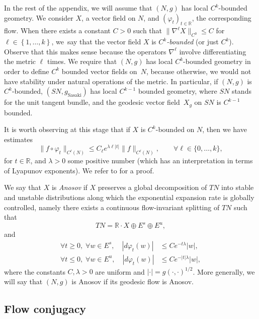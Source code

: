 \documentclass[10pt]{amsart}
\newcommand{\R}{\mathbb{R}}
\theoremstyle{plain}
\theoremstyle{definition}
\begin{document}
In the rest of the appendix, we will assume that $(N,g)$ has local $C^k$-bounded geometry. We consider $X$, a vector field on $N$, and $(\varphi_t)_{t \in \R}$, the corresponding flow. When there exists a constant $C > 0$ such that $\|\nabla^\ell X\|_{C^0} \leq C$ for $\ell \in \left\{1,\dots, k\right\}$, we~say that the vector field $X$ is \emph{$C^k$-bounded} (or just $C^k$). Observe that this makes sense because the operators $\nabla^\ell$ involve differentiating the metric $\ell$ times. We require that $(N,g)$ has local $C^k$-bounded geometry in order to define $C^k$ bounded vector fields on~$N$, because otherwise, we would not have stability under natural operations of the metric. In particular, if $(N,g)$ is $C^k$-bounded, $(SN, g_{\text{Sasaki}})$ has local $C^{k-1}$ bounded geometry, where $SN$ stands for the unit tangent bundle, and the geodesic vector field~$X_g$ on $SN$ is $C^{k-1}$ bounded.

It is worth observing at this stage that if $X$ is $C^k$-bounded on $N$, then we have estimates
\[
\| f\circ \varphi_t \|_{C^\ell(N)} \leq C_\ell e^{\lambda \ell |t|} \| f \|_{C^\ell(N)},\qquad \forall \ell \in\{0,\dots,k\},
\]
for $t\in \R$, and $\lambda > 0$ some positive number (which has an interpretation in terms of Lyapunov exponents). We refer to \cite[Prop.\,A.4.A]{Bonthonneau-15} for a proof.

We say that $X$ is \emph{Anosov} if $X$ preserves a global decomposition of $TN$ into stable and unstable distributions along which the exponential expansion rate is globally controlled, namely there exists a continuous flow-invariant splitting of $TN$ such that
\[
T N= \R \cdot X \oplus E^s \oplus E^u,
\]
and
\begin{equation}
\begin{split}
\forall t \geq 0,\; \forall w \in E^s,\quad |d\varphi_t(w)| &\leq Ce^{-t\lambda}|w|, \\
\forall t \leq 0,\; \forall w \in E^u,\quad |d\varphi_t(w)| &\leq Ce^{-|t|\lambda}|w|,
\end{split}
\end{equation}
where the constants $C,\lambda > 0$ are uniform and $|\cdot|=g(\cdot,\cdot)^{1/2}$. More generally, we will say that $(N,g)$ is Anosov if its geodesic flow is Anosov.

\subsection{Flow conjugacy}
\label{sec:conjugation}
\end{document}

